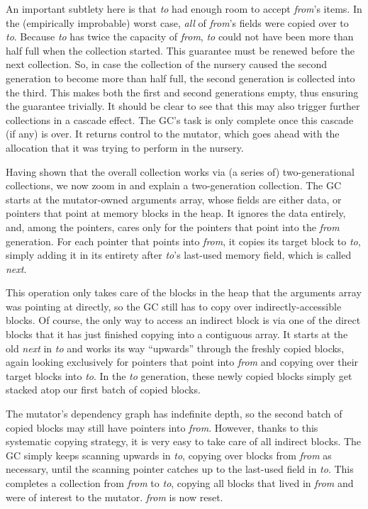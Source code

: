 An important subtlety here is that \emph{to} had enough 
room to accept \emph{from}'s items. 
In the (empirically improbable) worst case, 
\emph{all} of \emph{from}'s fields were copied over to \emph{to}.
Because \emph{to} has twice the capacity of \emph{from},
\emph{to} could not have been more than half full when 
the collection started.
This guarantee must be renewed before the next collection. 
So, in case the collection of the nursery caused
the second generation to become more than half full, 
the second generation is collected into the third. This makes 
both the first and second generations empty, thus ensuring 
the guarantee trivially. It should be 
clear to see that this may also trigger further collections in 
a cascade effect. The GC's task is only complete once this 
cascade (if any) is over. It returns control to the mutator,
which goes ahead with 
the allocation that it was trying to perform in the nursery.

Having shown that the overall collection 
works via (a series of) two-generational collections, 
we now zoom in and explain a two-generation collection.
The GC starts at the mutator-owned arguments array, whose fields
are either data, or pointers that point at memory blocks in the 
heap. It ignores the data entirely, and, among the pointers, 
cares only for the pointers that point into the \emph{from} generation. 
For each pointer that points into \emph{from}, it copies its
target block to \emph{to}, simply adding it in its entirety 
after \emph{to}'s last-used memory field, which is called \emph{next}. 

This operation only takes care of the blocks in the heap that 
the arguments array was pointing at directly, so the GC still has to copy 
over indirectly-accessible blocks. Of course, the only way to 
access an indirect 
block is via one of the direct blocks that it has
just finished copying into a contiguous array. 
It starts at the old \emph{next} in \emph{to}
and works its way ``upwards'' through the freshly copied blocks, 
again looking exclusively for pointers that point into \emph{from}
and copying over their target blocks into \emph{to}. 
In the \emph{to} generation, these newly copied blocks 
simply get stacked atop our first batch of copied blocks. 

The mutator's dependency graph has indefinite depth, so the second 
batch of copied blocks may still have pointers into \emph{from}. 
However, thanks to this systematic
copying strategy, it is very easy to take care of all indirect
blocks. The GC simply keeps scanning upwards in 
\emph{to}, copying over blocks from \emph{from} as necessary, 
until the scanning pointer catches up to the last-used field in
\emph{to}. This completes a collection 
from \emph{from} to \emph{to}, copying all blocks that lived
in \emph{from} and were of interest to the mutator. 
\emph{from} is now reset.


